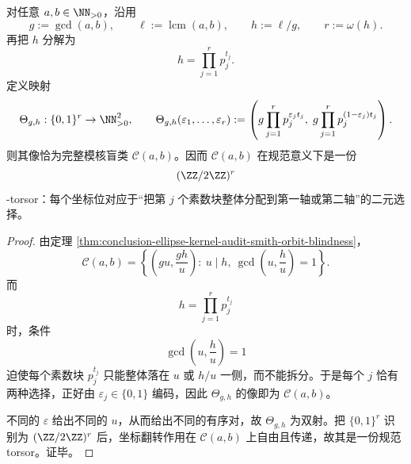 \begin{theorem}\label{thm:conclusion-ranktwo-smith-blindclass-boolean-primeblock-torsor}
对任意 \(a,b\in\NN_{>0}\)，沿用
\[
g:=\gcd(a,b),
\qquad
\ell:=\operatorname{lcm}(a,b),
\qquad
h:=\ell/g,
\qquad
r:=\omega(h).
\]
再把 \(h\) 分解为
\[
h=\prod_{j=1}^{r} p_j^{t_j}.
\]
定义映射
\[
\Theta_{g,h}:\{0,1\}^{r}\to \NN_{>0}^2,
\qquad
\Theta_{g,h}(\varepsilon_1,\dots,\varepsilon_r)
:=
\left(
g\prod_{j=1}^{r} p_j^{\varepsilon_j t_j},
\;
g\prod_{j=1}^{r} p_j^{(1-\varepsilon_j)t_j}
\right).
\]
则其像恰为完整模核盲类 \(\mathcal C(a,b)\)。因而 \(\mathcal C(a,b)\) 在规范意义下是一份
\[
(\ZZ/2\ZZ)^r
\]
-torsor：每个坐标位对应于“把第 \(j\) 个素数块整体分配到第一轴或第二轴”的二元选择。
\end{theorem}
\begin{proof}
由定理 \ref{thm:conclusion-ellipse-kernel-audit-smith-orbit-blindness}，
\[
\mathcal C(a,b)=
\left\{
\left(gu,\frac{gh}{u}\right):
\ u\mid h,\ \gcd\!\left(u,\frac{h}{u}\right)=1
\right\}.
\]
而
\[
h=\prod_{j=1}^{r}p_j^{t_j}
\]
时，条件
\[
\gcd\!\left(u,\frac{h}{u}\right)=1
\]
迫使每个素数块 \(p_j^{t_j}\) 只能整体落在 \(u\) 或 \(h/u\) 一侧，而不能拆分。于是每个 \(j\) 恰有两种选择，正好由 \(\varepsilon_j\in\{0,1\}\) 编码，因此 \(\Theta_{g,h}\) 的像即为 \(\mathcal C(a,b)\)。

不同的 \(\varepsilon\) 给出不同的 \(u\)，从而给出不同的有序对，故 \(\Theta_{g,h}\) 为双射。把 \(\{0,1\}^r\) 识别为 \((\ZZ/2\ZZ)^r\) 后，坐标翻转作用在 \(\mathcal C(a,b)\) 上自由且传递，故其是一份规范 torsor。证毕。
\end{proof}

